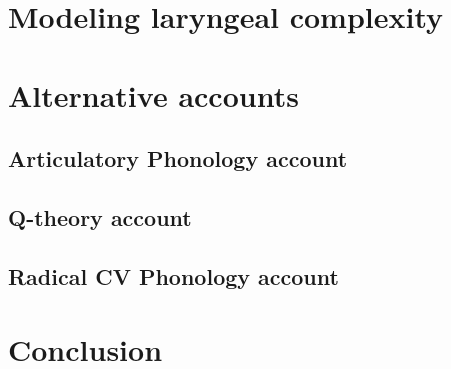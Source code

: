 \section{Modeling laryngeal complexity}\label{sec:modeling_lc}

\section{Alternative accounts}\label{sec:alternative_accounts}

\subsection{Articulatory Phonology account}\label{sec:ap_account}

\subsection{Q-theory account}\label{sec:q_theory_account}

\subsection{Radical CV Phonology account}\label{sec:rcv_account}

\section{Conclusion}\label{sec:conclusion_of_modeling_lc}
